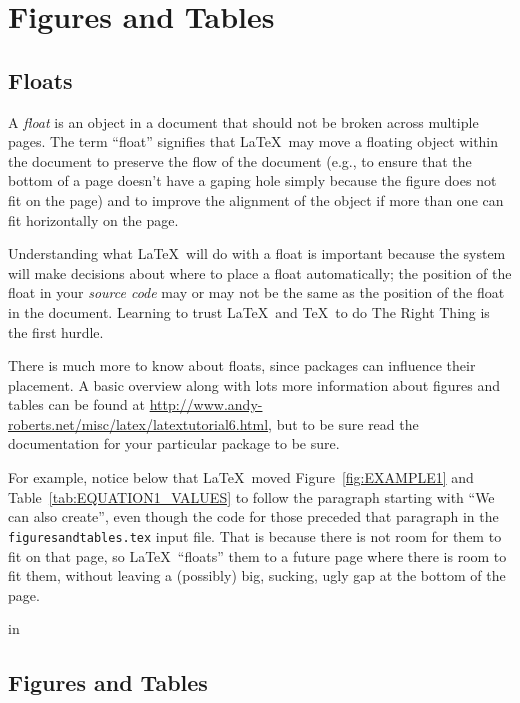 \chapter{Figures and Tables}
\label{chap:FIGURESANDTABLES}

\section{Floats}

A \emph{float} is an object in a document that should not be broken across
multiple pages. The term ``float'' signifies that \LaTeX\ may move
a floating object within the document to preserve the flow of the
document (e.g., to ensure that the bottom of a page doesn't have a
gaping hole simply because the figure does not fit on the page) and to
improve the alignment of the object if more than one can fit
horizontally on the page.

Understanding what \LaTeX\ will do with a float is important
because the system will make decisions about where to place
a float automatically; the position of the float in your
\emph{source code} may or may not be the same as the position of 
the float in the document.  Learning to trust \LaTeX\ and \TeX\
to do The Right Thing is the first hurdle.

There is much more to know about floats, since packages can
influence their placement. A basic overview along with lots
more information about figures and tables can be found at
\url{http://www.andy-roberts.net/misc/latex/latextutorial6.html},
but to be sure read the documentation for your 
particular package to be sure.

For example, notice below that \LaTeX\ moved Figure~\ref{fig:EXAMPLE1}
and Table~\ref{tab:EQUATION1_VALUES} to follow the paragraph starting
with ``We can also create'', even though the code for those preceded
that paragraph in the \verb|figuresandtables.tex| input file.  That is
because there is not room for them to fit on that page, so
\LaTeX\ ``floats'' them to a future page where there is room to fit
them, without leaving a (possibly) big, sucking, ugly gap at the
bottom of the page.


 in

\section{Figures and Tables}

